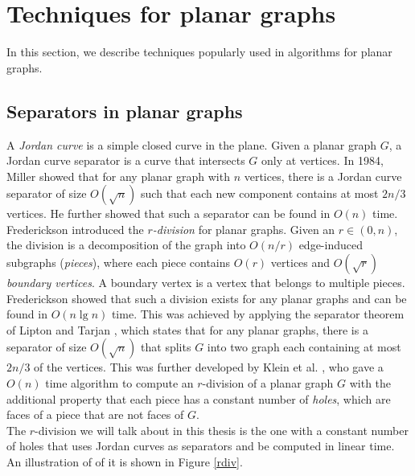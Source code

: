 \section{Techniques for planar graphs}\label{techniques}
In this section, we describe techniques popularly used in algorithms for planar graphs.

\subsection{Separators in planar graphs}
A \textit{Jordan curve} is a simple closed curve in the plane. Given a planar graph $G$,
a Jordan curve separator is a curve that intersects $G$ only at vertices. In 1984, Miller
\cite{miller1984finding} showed that for any planar graph with $n$ vertices, there is a Jordan curve
separator of size $O(\sqrt{n})$ such that each new component contains at most $2n/3$
vertices. He further showed that such a separator can be found in $O(n)$ time. \\
Frederickson introduced the \textit{$r$-division} for planar
graphs. Given an $r\in (0,n)$, the division is a decomposition of the graph into
$O(n/r)$ edge-induced subgraphs (\textit{pieces}), where each piece contains $O(r)$ vertices and $O(\sqrt{r})$ \textit{boundary vertices}. A
boundary vertex is a vertex that belongs to multiple pieces. Frederickson showed that
such a division exists for any planar graphs and can be found in $O(n\lg n)$ time. This
was achieved by applying the separator theorem of Lipton and Tarjan
\cite{lipton1979separator}, which states that for any planar graphs, there is a separator
of size $O(\sqrt{n})$ that splits $G$ into two graph each containing at most $2n/3$ of
the vertices. This was further developed
by Klein et al. \cite{klein2013structured}, who gave a $O(n)$ time algorithm to compute
an $r$-division of a planar graph $G$ with the additional property that each piece has a
constant number of \textit{holes}, which are faces of a piece that are not faces of $G$.
\\
The $r$-division we will talk about in this thesis is the one with a constant number of
holes that uses Jordan curves as separators and be computed in linear time. An
illustration of of it is shown in Figure \ref{rdiv}.

